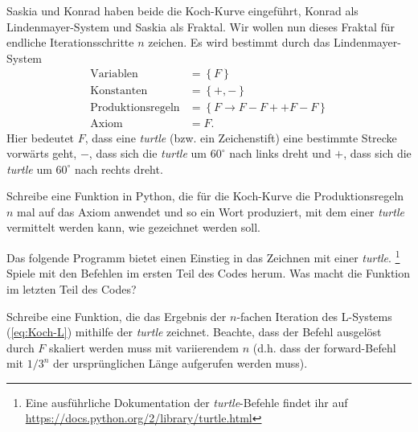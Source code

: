 
\exercise[
    topic = Fraktale und Selbst\"ahnlichkeit
]

Saskia und Konrad haben beide die Koch-Kurve eingef\"uhrt, Konrad als 
Lindenmayer-System und Saskia als Fraktal. Wir wollen nun dieses Fraktal
f\"ur endliche 
Iterationsschritte $n$ zeichen. Es wird 
bestimmt durch das Lindenmayer-System
\begin{subequations}
\label{eq:Koch-L}
\begin{align}
    \mathrm{Variablen} &= \left\{F\right\} \\
    \mathrm{Konstanten} &= \left\{+,-\right\} \\
    \mathrm{Produktionsregeln} &= \left\{F\rightarrow F-F++F-F\right\} \\
    \mathrm{Axiom} &= F.
\end{align}
\end{subequations}
Hier bedeutet $F$, dass eine \emph{turtle} (bzw. ein Zeichenstift) eine
bestimmte Strecke vorw\"arts geht, $-$, dass sich die \emph{turtle} um
$60^\circ$ nach links dreht und $+$, dass sich die \emph{turtle} um
$60^\circ$ nach rechts dreht.

\subexercise[
    topic = Anwenden der Iteration in L-System
]
    \label{ex:L-Koch}
    Schreibe eine Funktion in Python, die f\"ur die Koch-Kurve die
    Produktionsregeln $n$ mal auf das Axiom anwendet und so ein Wort produziert, mit
    dem einer \textit{turtle} vermittelt werden kann, wie gezeichnet werden soll.

\subexercise[
    topic = Teenage Mutant L-System Turtle
    ]

    Das folgende Programm bietet einen Einstieg in das Zeichnen mit
    einer \textit{turtle}. \footnote{Eine ausf\"uhrliche Dokumentation
        der \textit{turtle}-Befehle findet ihr auf
        \url{https://docs.python.org/2/library/turtle.html}
    }
        Spiele mit den Befehlen im ersten Teil des Codes herum. Was
        macht die Funktion im letzten Teil des Codes?

    

\subexercise[
    topic = Koch-Kurve zeichnen
    ]

    Schreibe eine Funktion, die das Ergebnis der $n$-fachen Iteration
    des L-Systems (\ref{eq:Koch-L}) mithilfe der \emph{turtle} zeichnet.
    Beachte, dass der Befehl ausgel\"ost durch $F$ skaliert werden muss
    mit variierendem $n$ (d.h. dass der forward-Befehl mit $1/3^n$ der
    urspr\"unglichen L\"ange aufgerufen werden muss).

